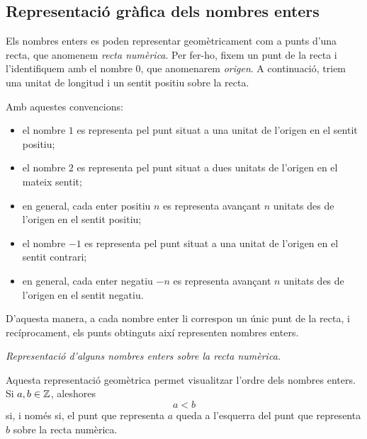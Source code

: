 \subsection{Representació gràfica dels nombres enters}
\label{subsec:representacio-enters}

Els nombres enters es poden representar geomètricament com a punts d'una recta, que anomenem \emph{recta numèrica}. Per fer-ho, fixem un punt de la recta i l'identifiquem amb el nombre \(0\), que anomenarem \emph{origen}. A continuació, triem una unitat de longitud i un sentit positiu sobre la recta.

Amb aquestes convencions:
\begin{itemize}
	\item el nombre \(1\) es representa pel punt situat a una unitat de l'origen en el sentit positiu;
	\item el nombre \(2\) es representa pel punt situat a dues unitats de l'origen en el mateix sentit;
	\item en general, cada enter positiu \(n\) es representa avançant \(n\) unitats des de l'origen en el sentit positiu;
	\item el nombre \(-1\) es representa pel punt situat a una unitat de l'origen en el sentit contrari;
	\item en general, cada enter negatiu \(-n\) es representa avançant \(n\) unitats des de l'origen en el sentit negatiu.
\end{itemize}

D'aquesta manera, a cada nombre enter li correspon un únic punt de la recta, i recíprocament, els punts obtinguts així representen nombres enters.

\begin{center}

\smallskip
\textit{Representació d'alguns nombres enters sobre la recta numèrica.}
\end{center}

Aquesta representació geomètrica permet visualitzar l'ordre dels nombres enters. Si \(a,b\in\mathbb{Z}\), aleshores
\[
	a<b
\]
si, i només si, el punt que representa \(a\) queda a l'esquerra del punt que representa \(b\) sobre la recta numèrica.

